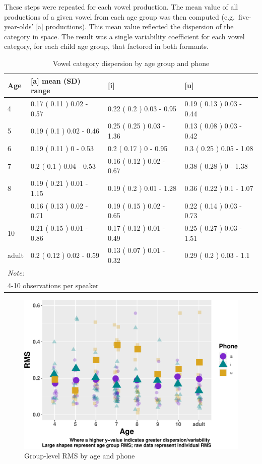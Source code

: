 \documentclass[
]{article}
\begin{document}
These steps were repeated for each vowel production. The mean value of all productions of a given vowel from each age group was then computed (e.g.~five-year-olds' {[}a{]} productions). This mean value reflected the dispersion of the category in space. The result was a single variability coefficient for each vowel category, for each child age group, that factored in both formants.

\begin{table}[!h]

\caption{\label{tab:RMS-tbl-group}Vowel category dispersion by age group and phone}
\centering
\begin{tabular}[t]{llll}
\toprule
Age & [a] mean (SD) range & [i] & [u]\\
\midrule
4 & 0.17 ( 0.11 ) 0.02 - 0.57 & 0.22 ( 0.2 ) 0.03 - 0.95 & 0.19 ( 0.13 ) 0.03 - 0.44\\
5 & 0.19 ( 0.1 ) 0.02 - 0.46 & 0.25 ( 0.25 ) 0.03 - 1.36 & 0.13 ( 0.08 ) 0.03 - 0.42\\
6 & 0.19 ( 0.11 ) 0 - 0.53 & 0.2 ( 0.17 ) 0 - 0.95 & 0.3 ( 0.25 ) 0.05 - 1.08\\
7 & 0.2 ( 0.1 ) 0.04 - 0.53 & 0.16 ( 0.12 ) 0.02 - 0.67 & 0.38 ( 0.28 ) 0 - 1.38\\
8 & 0.19 ( 0.21 ) 0.01 - 1.15 & 0.19 ( 0.2 ) 0.01 - 1.28 & 0.36 ( 0.22 ) 0.1 - 1.07\\
\addlinespace
9 & 0.16 ( 0.13 ) 0.02 - 0.71 & 0.19 ( 0.15 ) 0.02 - 0.65 & 0.22 ( 0.14 ) 0.03 - 0.73\\
10 & 0.21 ( 0.15 ) 0.01 - 0.86 & 0.17 ( 0.12 ) 0.01 - 0.49 & 0.25 ( 0.27 ) 0.03 - 1.51\\
adult & 0.2 ( 0.12 ) 0.02 - 0.59 & 0.13 ( 0.07 ) 0.01 - 0.32 & 0.29 ( 0.2 ) 0.03 - 1.1\\
\bottomrule
\multicolumn{4}{l}{\textit{Note: }}\\
\multicolumn{4}{l}{4-10 observations per speaker}\\
\end{tabular}
\end{table}

\begin{figure}
\centering
\includegraphics{3_vtl_results_files/figure-latex/delta-disp-fig-RMS-1.pdf}
\caption{\label{fig:delta-disp-fig-RMS}Group-level RMS by age and phone}
\end{figure}
\end{document}
